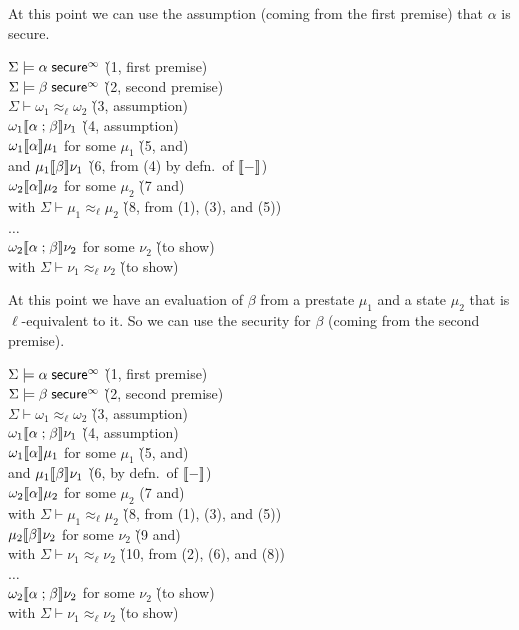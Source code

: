 \documentclass[11pt]{article}
\begin{document}
At this point we can use the assumption (coming from the first premise)
that $\alpha$ is secure.
\begin{tabbing}
  $\Sigma \models \alpha\; \mathsf{secure}^\infty$ \` (1, first premise) \\
  $\Sigma \models \beta\; \mathsf{secure}^\infty$ \` (2, second premise) \\
  $\Sigma \vdash \omega_1 \approx_\ell \omega_2$ \` (3, assumption) \\
  $\omega_1 \llbracket \alpha \mathrel{;} \beta \rrbracket \nu_1$ \` (4, assumption) \\
  $\omega_1 \llbracket \alpha \rrbracket \mu_1$ for some $\mu_1$ \` (5, and) \\
  and $\mu_1 \llbracket \beta \rrbracket \nu_1$ \` (6, from (4) by defn.\ of $\llbracket{-}\rrbracket$) \\
  \color{blue}$\omega_2 \llbracket \alpha \rrbracket \mu_2$ for some $\mu_2$ \` (7 and)\\
  \color{blue}with $\Sigma \vdash \mu_1 \approx_\ell \mu_2$ \` (8, from (1), (3), and (5)) \\
  $\ldots$ \\
  $\omega_2 \llbracket \alpha \mathrel{;} \beta \rrbracket \nu_2$ for some $\nu_2$ \` (to show) \\
  with $\Sigma \vdash \nu_1 \approx_\ell \nu_2$ \` (to show)
\end{tabbing}
At this point we have an evaluation of $\beta$ from a prestate $\mu_1$ and a
state $\mu_2$ that is $\ell$-equivalent to it.  So we can use the security
for $\beta$ (coming from the second premise).
\begin{tabbing}
  $\Sigma \models \alpha\; \mathsf{secure}^\infty$ \` (1, first premise) \\
  $\Sigma \models \beta\; \mathsf{secure}^\infty$ \` (2, second premise) \\
  $\Sigma \vdash \omega_1 \approx_\ell \omega_2$ \` (3, assumption) \\
  $\omega_1 \llbracket \alpha \mathrel{;} \beta \rrbracket \nu_1$ \` (4, assumption) \\
  $\omega_1 \llbracket \alpha \rrbracket \mu_1$ for some $\mu_1$ \` (5, and) \\
  and $\mu_1 \llbracket \beta \rrbracket \nu_1$ \` (6, by defn.\ of $\llbracket{-}\rrbracket$) \\
  $\omega_2 \llbracket \alpha \rrbracket \mu_2$ for some $\mu_2$ (7 and) \\
  with $\Sigma \vdash \mu_1 \approx_\ell \mu_2$ \` (8, from (1), (3), and (5)) \\
  \color{blue}  $\mu_2 \llbracket \beta \rrbracket \nu_2$ for some $\nu_2$ \` (9 and) \\
  \color{blue}  with $\Sigma \vdash \nu_1 \approx_\ell \nu_2$ \` (10, from (2), (6), and (8)) \\
  $\ldots$ \\
  $\omega_2 \llbracket \alpha \mathrel{;} \beta \rrbracket \nu_2$ for some $\nu_2$ \` (to show) \\
  with $\Sigma \vdash \nu_1 \approx_\ell \nu_2$ \` (to show)
\end{tabbing}
\end{document}
